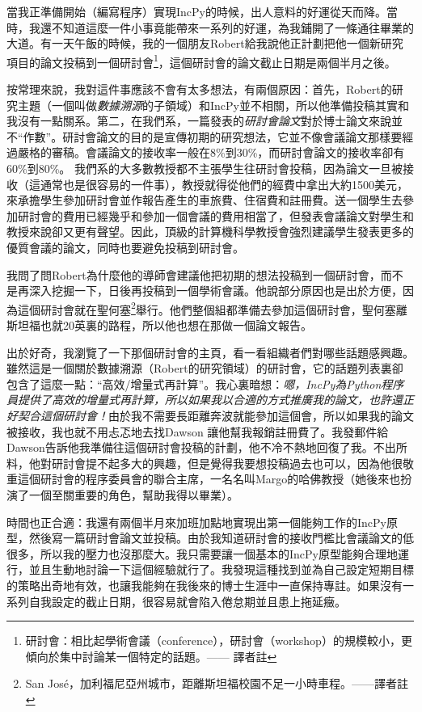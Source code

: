 \documentclass[12pt,UTF8,nofonts]{book}
\begin{document}
當我正準備開始（編寫程序）實現IncPy的時候，出人意料的好運從天而降。當時，我還不知道這麼一件小事竟能帶來一系列的好運，為我鋪開了一條通往畢業的大道。有一天午飯的時候，我的一個朋友Robert給我說他正計劃把他一個新研究項目的論文投稿到一個研討會\footnote{研討會：相比起學術會議（conference），研討會（workshop）的規模較小，更傾向於集中討論某一個特定的話題。—— 譯者註}，這個研討會的論文截止日期是兩個半月之後。

按常理來說，我對這件事應該不會有太多想法，有兩個原因：首先，Robert的研究主題（一個叫做\emph{數據溯源}的子領域）和IncPy並不相關，所以他準備投稿其實和我沒有一點關系。第二，在我們系，一篇發表的\emph{研討會論文}對於博士論文來說並不“作數”。研討會論文的目的是宣傳初期的研究想法，它並不像會議論文那樣要經過嚴格的審稿。會議論文的接收率一般在8\%到30\%，而研討會論文的接收率卻有60\%到80\%。 我們系的大多數教授都不主張學生往研討會投稿，因為論文一旦被接收（這通常也是很容易的一件事），教授就得從他們的經費中拿出大約1500美元，來承擔學生參加研討會並作報告產生的車旅費、住宿費和註冊費。送一個學生去參加研討會的費用已經幾乎和參加一個會議的費用相當了，但發表會議論文對學生和教授來說卻又更有聲望。因此，頂級的計算機科學教授會強烈建議學生發表更多的優質會議的論文，同時也要避免投稿到研討會。

我問了問Robert為什麼他的導師會建議他把初期的想法投稿到一個研討會，而不是再深入挖掘一下，日後再投稿到一個學術會議。他說部分原因也是出於方便，因為這個研討會就在聖何塞\footnote{San Jos\'e，加利福尼亞州城市，距離斯坦福校園不足一小時車程。——譯者註}舉行。他們整個組都準備去參加這個研討會，聖何塞離斯坦福也就20英裏的路程，所以他也想在那做一個論文報告。

出於好奇，我瀏覽了一下那個研討會的主頁，看一看組織者們對哪些話題感興趣。雖然這是一個關於數據溯源（Robert的研究領域）的研討會，它的話題列表裏卻包含了這麼一點：“高效/增量式再計算”。我心裏暗想：\emph{嗯，IncPy為Python程序員提供了高效的增量式再計算，所以如果我以合適的方式推廣我的論文，也許還正好契合這個研討會！}由於我不需要長距離奔波就能參加這個會，所以如果我的論文被接收，我也就不用忐忑地去找Dawson 讓他幫我報銷註冊費了。我發郵件給Dawson告訴他我準備往這個研討會投稿的計劃，他不冷不熱地回復了我。不出所料，他對研討會提不起多大的興趣，但是覺得我要想投稿過去也可以，因為他很敬重這個研討會的程序委員會的聯合主席，一名名叫Margo的哈佛教授（她後來也扮演了一個至關重要的角色，幫助我得以畢業）。

時間也正合適：我還有兩個半月來加班加點地實現出第一個能夠工作的IncPy原型，然後寫一篇研討會論文並投稿。由於我知道研討會的接收門檻比會議論文的低很多，所以我的壓力也沒那麼大。我只需要讓一個基本的IncPy原型能夠合理地運行，並且生動地討論一下這個經驗就行了。我發現這種找到並為自己設定短期目標的策略出奇地有效，也讓我能夠在我後來的博士生涯中一直保持專註。如果沒有一系列自我設定的截止日期，很容易就會陷入倦怠期並且患上拖延癥。
\end{document}
